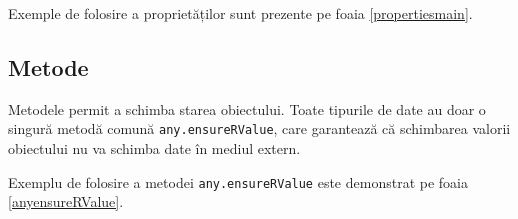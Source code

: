 Exemple de folosire a proprietăților sunt prezente pe foaia \ref{propertiesmain}.

\subsection{Metode}

Metodele permit a schimba starea obiectului. Toate tipurile de date au doar o singură metodă comună \texttt{any.ensureRValue}, care garantează că schimbarea valorii obiectului nu va schimba date în mediul extern.

Exemplu de folosire a metodei \texttt{any.ensureRValue} este demonstrat pe foaia \ref{anyensureRValue}.

\newpage
\begin{sourcecode}
\label{propertiesmain}
\inputminted[linenos]{icl}{../sources/propertiesmain.icL}
\end{sourcecode}


\begin{sourcecode}
\label{anyensureRValue}
\inputminted[linenos]{icl}{../sources/anyensureRValue.icL}
\end{sourcecode}
